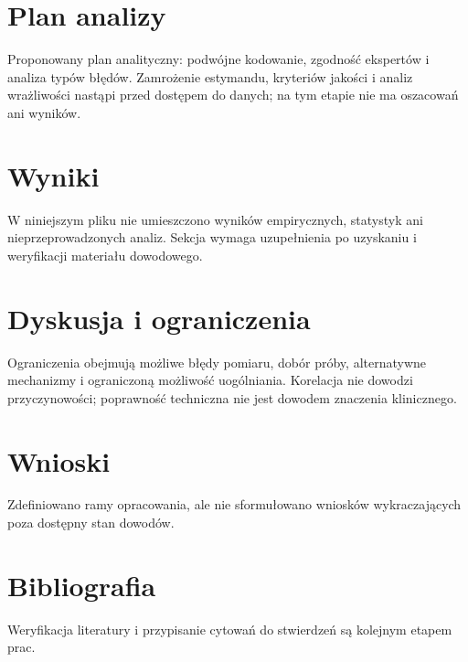 \documentclass[11pt,a4paper]{article}
\begin{document}
\section{Plan analizy}

Proponowany plan analityczny: podwójne kodowanie, zgodność ekspertów i analiza typów błędów. Zamrożenie estymandu, kryteriów jakości i analiz wrażliwości nastąpi przed dostępem do danych; na tym etapie nie ma oszacowań ani wyników.

\section{Wyniki}

W niniejszym pliku nie umieszczono wyników empirycznych, statystyk ani nieprzeprowadzonych analiz. Sekcja wymaga uzupełnienia po uzyskaniu i weryfikacji materiału dowodowego.

\section{Dyskusja i ograniczenia}

Ograniczenia obejmują możliwe błędy pomiaru, dobór próby, alternatywne mechanizmy i ograniczoną możliwość uogólniania. Korelacja nie dowodzi przyczynowości; poprawność techniczna nie jest dowodem znaczenia klinicznego.

\section{Wnioski}

Zdefiniowano ramy opracowania, ale nie sformułowano wniosków wykraczających poza dostępny stan dowodów.

\section*{Bibliografia}

Weryfikacja literatury i przypisanie cytowań do stwierdzeń są kolejnym etapem prac.
\end{document}
